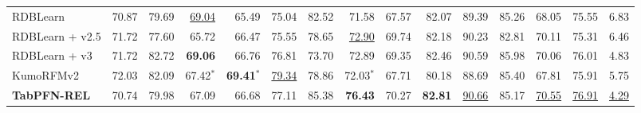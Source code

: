 \begin{table}[H]
{\begin{tabular}{lrrrrrrrrrrrrrr}
RDBLearn & 70.87 & 79.69 & \underline{69.04} & 65.49 & 75.04 & 82.52 & 71.58 & 67.57 & 82.07 & 89.39 & 85.26 & 68.05 & 75.55 & 6.83 \\
\addlinespace[3pt]
RDBLearn + v2.5 & 71.72 & 77.60 & 65.72 & 66.47 & 75.55 & 78.65 & \underline{72.90} & 69.74 & 82.18 & 90.23 & 82.81 & 70.11 & 75.31 & 6.46 \\
RDBLearn + v3 & 71.72 & 82.72 & \textbf{69.06} & 66.76 & 76.81 & 73.70 & 72.89 & 69.35 & 82.46 & 90.59 & 85.98 & 70.06 & 76.01 & 4.83 \\
\addlinespace[3pt]
KumoRFMv2 & 72.03 & 82.09 & 67.42$^{*}$ & \textbf{69.41$^{*}$} & \underline{79.34} & 78.86 & 72.03$^{*}$ & 67.71 & 80.18 & 88.69 & 85.40 & 67.81 & 75.91 & 5.75 \\
\addlinespace[3pt]
\textbf{TabPFN-REL} & 70.74 & 79.98 & 67.09 & 66.68 & 77.11 & 85.38 & \textbf{76.43} & 70.27 & \textbf{82.81} & \underline{90.66} & 85.17 & \underline{70.55} & \underline{76.91} & \underline{4.29} \\
\bottomrule
\end{tabular}}
\end{table}

